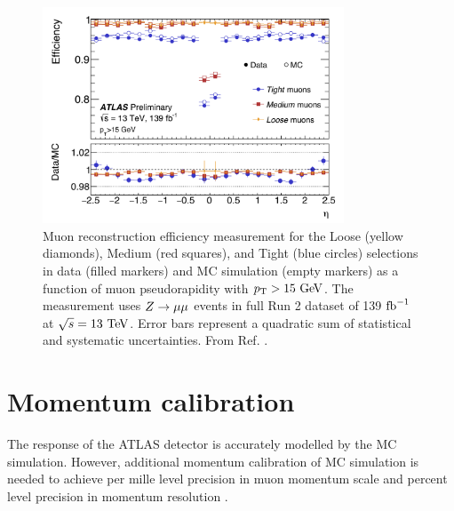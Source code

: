 \begin{figure}[h]
  \centering
  \includegraphics[width=0.8\textwidth]{figures/muons/reco_eff}
  \caption[Muon reconstruction efficiency.]{Muon reconstruction
  efficiency measurement for the Loose (yellow diamonds), Medium
  (red squares), and Tight (blue circles) selections in data
  (filled markers) and MC simulation (empty markers) as a function
  of muon pseudorapidity with $p_{\text{T}} > 15~\text{Ge\kern -0.1em V}$. The measurement
  uses $Z \rightarrow \mu\mu$ events in full Run 2 dataset of 139 $\text{fb}^{-1}$
  at $\sqrt{s}=13~\text{Te\kern -0.1em V}$. Error bars represent a quadratic sum of
  statistical and systematic uncertainties. From Ref. \cite{Junggeburth:2685295}.}
  \label{fig:muon:reco_eff}
\end{figure}

\section{Momentum calibration}

The response of the ATLAS detector is accurately modelled by the
MC simulation. However, additional momentum calibration of MC simulation
is needed to achieve per mille level precision in muon momentum scale
and percent level precision in momentum resolution \cite{Aad:2016jkr}.

